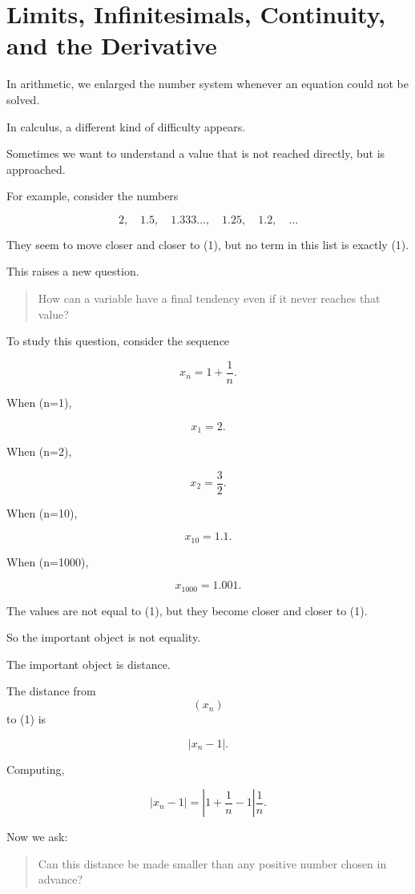 \section{Limits, Infinitesimals, Continuity, and the Derivative}

In arithmetic, we enlarged the number system whenever an equation could not be solved.

In calculus, a different kind of difficulty appears.

Sometimes we want to understand a value that is not reached directly, but is approached.

For example, consider the numbers

\[
2,\quad 1.5,\quad 1.333\ldots,\quad 1.25,\quad 1.2,\quad \ldots
\]

They seem to move closer and closer to (1), but no term in this list is exactly (1).

This raises a new question.

\begin{quote}
How can a variable have a final tendency even if it never reaches that value?
\end{quote}

To study this question, consider the sequence

\[
x_n = 1+\frac{1}{n}.
\]

When (n=1),

\[
x_1=2.
\]

When (n=2),

\[
x_2=\frac{3}{2}.
\]

When (n=10),

\[
x_{10}=1.1.
\]

When (n=1000),

\[
x_{1000}=1.001.
\]

The values are not equal to (1), but they become closer and closer to (1).

So the important object is not equality.

The important object is distance.

The distance from $$(x_n)$$ to (1) is

\[
|x_n-1|.
\]

Computing,

\[
|x_n-1| = \left|1+\frac{1}{n}-1\right| \frac{1}{n}.
\]

Now we ask:

\begin{quote}
Can this distance be made smaller than any positive number chosen in advance?
\end{quote}


